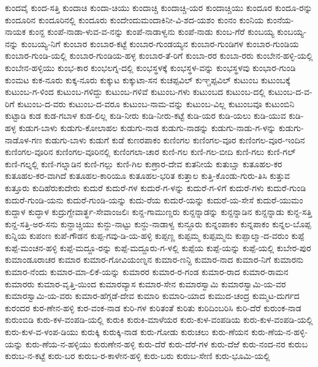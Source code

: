 ಕುಂದವೈ
ಕುಂದ-ಸತ್ತಿ
ಕುಂದಾಚಿ
ಕುಂದಾ-ಚಿಯು
ಕುಂದಾಚ್ಚಿ
ಕುಂದಾಚ್ಚಿ-ಯರ
ಕುಂದಾಚ್ಚಿಯು
ಕುಂದೂರ
ಕುಂದೂ-ರನ್ನು
ಕುಂದೂರಿನ
ಕುಂದೂರಿನಲ್ಲಿ
ಕುಂದೂರು
ಕುಂದೇಂದುಮಂದಾಕಿನೀ-ವಿ-ಶದ-ಯಶಂ
ಕುಂನಂ
ಕುಂನಿಯ
ಕುಂನೆಯ-ನಾಯಕ
ಕುಂನ್ದ
ಕುಂಪೆ-ನಾಡಾ-ಳುವ-ವ-ನನ್ನು
ಕುಂಪೆ-ನಾಡಾಳ್ವನು
ಕುಂಪೆ-ನಾಡು
ಕುಂಬ-ಗೆರೆ
ಕುಂಬಯ್ಯ
ಕುಂಬಯ್ಯ-ನನ್ನು
ಕುಂಬಯ್ಯ-ನಿಗೆ
ಕುಂಬಾರ
ಕುಂಬಾರ-ಕಟ್ಟೆ
ಕುಂಬಾರ-ಗುಂಡಯ್ಯನ
ಕುಂಬಾರ-ಗುಂಡಿಗಳ
ಕುಂಬಾರ-ಗುಂಡಿಯ
ಕುಂಬಾರ-ಗುಂಡಿ-ಯಲ್ಲಿ
ಕುಂಬಾರ-ಗುಂಡಿಯ-ಹಳ್ಳ
ಕುಂಬಾರ-ತೆ-ರಿಗೆ
ಕುಂಬಾ-ರರ
ಕುಂಬಾ-ರರು
ಕುಂಬೇನ-ಹಳ್ಳಿ-ಯಲ್ಲಿ
ಕುಂಬೇನ-ಹಳ್ಳಿಯು
ಕುಂಭ-ಕಾರ
ಕುಂಭಲಗ್ನ-ದಲ್ಲಿ
ಕುಂಭಸ್ಥಳಕ್ಕೆ
ಕುಂಭಸ್ಥಳ-ವನ್ನು
ಕುಂಭಸ್ಥಳವು
ಕುಂಭಾರ-ಗುಂಡಿ
ಕುಂಮಟ
ಕುಕ-ನೂರು
ಕುಕ್ಕ-ನೂರು
ಕುಕ್ಕುಟ
ಕುಕ್ಕುಟಾ-ಸನ
ಕುಚಪ್ಪವಿಲ್
ಕುಞ್ಚಪ್ಪವಿಲ್
ಕುಟುಂಬ
ಕುಟುಂಬಕ್ಕೆ
ಕುಟುಂಬ-ಗ-ಳಿಂದ
ಕುಟುಂಬ-ಗಳಿದ್ದು
ಕುಟುಂಬ-ಗಳಿವೆ
ಕುಟುಂಬ-ಗಳು
ಕುಟುಂಬದ
ಕುಟುಂಬ-ದಲ್ಲಿ
ಕುಟುಂಬ-ದ-ವ-ರಿಗೆ
ಕುಟುಂಬ-ದ-ವರು
ಕುಟುಂಬ-ದ-ವರೂ
ಕುಟುಂಬ-ನಾಮ-ವನ್ನು
ಕುಟುಂಬ-ವಿಲ್ಲ
ಕುಟುಂಬವೂ
ಕುಟುಂಬಿನಿ
ಕುಟ್ಟಾಡಿ
ಕುಡ
ಕುಡ-ಗಬಾಳ
ಕುಡ-ಲಿಲ್ಲ
ಕುಡಿ-ನೀರು
ಕುಡಿ-ನೀರು-ಕಟ್ಟೆ
ಕುಡಿ-ಯರ
ಕುಡಿ-ಯಲು
ಕುಡಿ-ಯುವ
ಕುಡಿ-ಹಳ್ಳ
ಕುಡುಗ-ಬಾಳು
ಕುಡುಗು-ಕೋಲಾಹಲ
ಕುಡುಗು-ನಾಡ
ಕುಡುಗು-ನಾಡನ್ನು
ಕುಡುಗು-ನಾಡು-ಗ-ಳನ್ನು
ಕುಡುಗು-ನಾಡೊಳ-ಗಣ
ಕುಡುಗು-ಬಾಳು
ಕುಡುಗೆ
ಕುಡೆ
ಕುಣರಪಾಕಂ
ಕುಣಿಂಗಲ
ಕುಣಿಂಗಲ-ವೂರ
ಕುಣಿಂಗಲ-ವೂರ-ಇಂದಿನ
ಕುಣಿಂಗಲ-ವೂರಿನ
ಕುಣಿಂಗಲ-ವೂರಿನಲ್ಲಿ
ಕುಣಿಂಗಲಾ-ಚಾರ
ಕುಣಿ-ಗಲ
ಕುಣಿ-ಗಲ-ಬೀದಿ
ಕುಣಿ-ಗಲು
ಕುಣಿ-ಗಲ್
ಕುಣಿ-ಗಲ್ನಲ್ಲಿ
ಕುಣಿ-ಗಲ್ನಾಡಿನ
ಕುಣಿ-ಗಲ್ಲು
ಕುಣಿ-ಗಿಲ
ಕುಣ್ರಾರ-ದೇವ
ಕುತನೀಯೆ
ಕುತುಬ್ಷಾ
ಕುತೂಹಲ-ಕರ
ಕುತೂಹಲ-ಕರ-ವಾಗಿದೆ
ಕುತೂಹಲ-ಕಾರಿಯೂ
ಕುತೂಹಲ-ಭರಿತ
ಕುತ್ತಾಲ
ಕುತ್ತಿ-ಕೊಂಡು-ಗುರು-ತಿಸಿ
ಕುತ್ತುವ
ಕುತ್ತೂರು
ಕುದಿಹೆರುಕುದೇರು
ಕುದುರೆ
ಕುದುರೆ-ಗಳ
ಕುದುರೆ-ಗ-ಳನ್ನು
ಕುದುರೆ-ಗ-ಳಿಗೆ
ಕುದುರೆ-ಗಳು
ಕುದುರೆ-ಗುಂಡಿ
ಕುದುರೆ-ಗುಂಡಿ-ಯನು
ಕುದುರೆ-ಗುಂಡಿ-ಯನ್ನು
ಕುದು-ರೆಯ
ಕುದುರೆ-ಯನ್ನು
ಕುದುರೆ-ಯ-ಸೇಸೆ
ಕುದುರೆ-ಯುಮಂ
ಕುದ್ದಾಳ
ಕುದ್ಧಾಳ
ಕುದ್ರುಗ್ದೇವಾರ್ತ್ಥ-ಸೇವಾಂಜಲಿಃ
ಕುನ್ದ-ಗಾಮುಣ್ಡರು
ಕುನ್ದನ್ನಾಡನ್ನು
ಕುನ್ದನ್ನಾಡಿನ
ಕುನ್ದನ್ನಾಡು
ಕುನ್ದ-ಸತ್ತಿ
ಕುನ್ದ-ಸತ್ತಿ-ಅರ-ಸನು
ಕುನ್ದಾಚ್ಚಿಯು
ಕುನ್ದು-ನಾಟ್ಟು
ಕುನ್ದು-ನಾಡಾಳ್ವ
ಕುನ್ದೂರು
ಕುನ್ನಂಪಾಕಂ
ಕುನ್ನಪಾಕಂ
ಕುನ್ನಲ-ಬೊಪ್ಪ
ಕುನ್ನಿಯ
ಕುಪಂಣ
ಕುಪೆ-ಗೌಡನ
ಕುಪ್ಪ-ಗವು-ಡಿ-ಯ-ಹಳ್ಳಿ
ಕುಪ್ಪಣ್ಣ
ಕುಪ್ಪಮ್ಮ
ಕುಪ್ಪಮ್ಮನು
ಕುಪ್ಪಾಲ್ಮಾ-ದ-ವರುಂ
ಕುಪ್ಪೆ
ಕುಪ್ಪೆ-ಮಂಚನ-ಹಳ್ಳಿ
ಕುಪ್ಪೆ-ಮದ್ದೂ-ರನ್ನು
ಕುಪ್ಪೆ-ಮದ್ದೂರು-ಗ-ಳಲ್ಲಿ
ಕುಪ್ಪೆಯ
ಕುಪ್ಪೆ-ಯನ್ನು
ಕುಪ್ಪೆ-ಯಲ್ಲಿ
ಕುಬೇರ-ಪುರ
ಕುಮಾಂಡೂರಾಚರ
ಕುಮಾರ
ಕುಮಾರ-ಗೋವಿಯಂಣ್ನನ
ಕುಮಾರ-ಣನ್ದಿ
ಕುಮಾರ-ನಾದ
ಕುಮಾರ-ನಿಗೆ
ಕುಮಾರನು
ಕುಮಾರ-ನೆಂದು
ಕುಮಾರ-ಮಾ-ಲಿಕೆ-ಯನ್ನು
ಕುಮಾರರ
ಕುಮಾರ-ರ-ಗಂಡ
ಕುಮಾರ-ರಾದ
ಕುಮಾರ-ರಾಮನ
ಕುಮಾರರು
ಕುಮಾರ-ವೃತ್ತಿ-ಯಿಂದ
ಕುಮಾರವ್ಯಾಸ
ಕುಮಾರ-ಸೇನ
ಕುಮಾರಸ್ವಾಮಿ
ಕುಮಾರಸ್ವಾಮಿ-ಯ-ವರ
ಕುಮಾರಸ್ವಾಮಿ-ಯ-ವರು
ಕುಮಾರ-ಹೆಗ್ಗಡೆ-ದೇವ
ಕುಮಾರಿ
ಕುಮಾರಿ-ಯಾದ
ಕುಮುದ-ಚಂದ್ರ
ಕುಮ್ಮಟ-ದುರ್ಗದ
ಕುರಂದರ
ಕುರ-ಣೇನ-ಹಳ್ಳಿ
ಕುರ-ವಂಕ-ನಾಡ
ಕುರಿ-ಗಳ
ಕುರಿತಂತೆ
ಕುರಿತು
ಕುರಿದಿಂಬರಿಸಿ
ಕುರಿ-ದೆರೆ
ಕುರುಂಕ-ನಾಡ
ಕುರುಂಬಿಡಿ
ಕುರು-ಕಳ-ವಂಪಡಿ-ಯಲ್ಲಿ
ಕುರುಕಿ
ಕುರುಕಿ-ಮಾಳೆಯರ
ಕುರು-ಕುಳ-ವಂಪಡಿಯ
ಕುರು-ಕುಳ-ವಂಪಡಿ-ಯಲ್ಲಿ
ಕುರು-ಕುಳ-ವ-ಳಂಪ-ಡಿಯು
ಕುರುಕ್ಕಿ
ಕುರುಕ್ಕಿ-ನಾಡ
ಕುರು-ಗೋಡು
ಕುರುಚಲು
ಕುರು-ಣೆಯನ
ಕುರು-ಣೆಯ-ನ-ಹಳ್ಳಿ-ಯನ್ನು
ಕುರು-ಣೆಯ-ನ-ಹಳ್ಳಿಯು
ಕುರುಣೇನ-ಹಳ್ಳಿ
ಕುರು-ದೆರೆ
ಕುರು-ದೆರೆ-ಗಳ
ಕುರು-ದೆಱೆ
ಕುರು-ನಂದ-ನರ
ಕುರುಬ
ಕುರುಬ-ನ-ಕಟ್ಟೆ
ಕುರು-ಬರ
ಕುರುಬ-ರ-ಕಾಳೇನ-ಹಳ್ಳಿ
ಕುರು-ಬರು
ಕುರುಬ-ಸೇಣಿ
ಕುರು-ಭೂಮಿ-ಯಲ್ಲಿ
